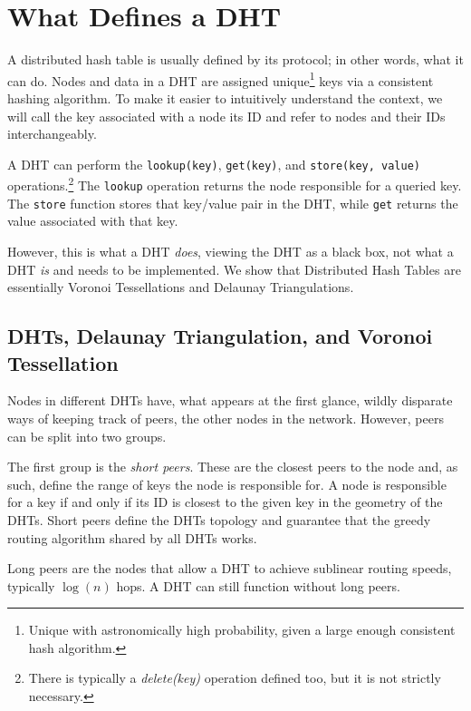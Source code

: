 \documentclass[11pt,conference]{IEEEtran}
\begin{document}
\section{What Defines a DHT}
\label{sec:define}

A distributed hash table is usually defined by its protocol; in other words, what it can do.
Nodes and data in a DHT are assigned unique\footnote{Unique with astronomically high probability, given a large enough consistent hash algorithm.} keys via a consistent hashing algorithm.
To make it easier to intuitively understand the context, we will call the key associated with a node its ID and refer to nodes and their IDs interchangeably.

A DHT can perform the \texttt{lookup(key)}, \texttt{get(key)}, and \texttt{store(key, value)} operations.\footnote{There is typically a \textit{delete(key)} operation defined too, but it is not strictly necessary.}
The \texttt{lookup} operation returns the node responsible for a queried key.
The \texttt{store} function stores that key/value pair in the DHT, while \texttt{get} returns the value associated with that key.

However, this is what a DHT \textit{does}, viewing the DHT as a black box, not what a DHT \textit{is} and needs to be implemented.
We show that Distributed Hash Tables are essentially Voronoi Tessellations and Delaunay Triangulations.

\subsection{DHTs, Delaunay Triangulation, and Voronoi Tessellation}

Nodes in different DHTs have, what appears at the first glance, wildly disparate ways of keeping track of peers, the other nodes in the network.
However, peers can be split into two groups.

The first group is the \textit{short peers}.
These are the closest peers to the node and, as such, define the range of keys the node is responsible for. 
A node is responsible for a key if and only if its ID is closest to the given key in the geometry of the DHTs.
Short peers define the DHTs topology and guarantee that the greedy routing algorithm shared by all DHTs works.


Long peers are the nodes that allow a DHT to achieve sublinear routing speeds, typically $ \log(n) $ hops.
A DHT can still function without long peers.
\end{document}
